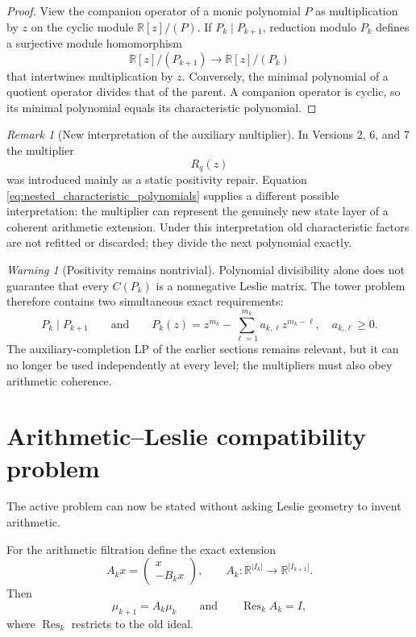 \documentclass[11pt]{amsart}
\numberwithin{equation}{section}
\theoremstyle{plain}
\theoremstyle{definition}
\theoremstyle{remark}
\newtheorem{remark}[theorem]{Remark}
\newtheorem{warning}[theorem]{Warning}
\begin{document}
\begin{proof}
View the companion operator of a monic polynomial $P$ as multiplication by $z$ on the cyclic
module $\mathbb R[z]/(P)$.  If $P_k\mid P_{k+1}$, reduction modulo $P_k$ defines a surjective
module homomorphism
\[
\mathbb R[z]/(P_{k+1})
\longrightarrow
\mathbb R[z]/(P_k)
\]
that intertwines multiplication by $z$.  Conversely, the minimal polynomial of a quotient
operator divides that of the parent.  A companion operator is cyclic, so its minimal polynomial
equals its characteristic polynomial.
\end{proof}

\begin{remark}[New interpretation of the auxiliary multiplier]
\label{rem:auxiliary_as_arithmetic_layer}
In Versions 2, 6, and 7 the multiplier
\[
R_q(z)
\]
was introduced mainly as a static positivity repair.  Equation
\eqref{eq:nested_characteristic_polynomials} supplies a different possible interpretation:
the multiplier can represent the genuinely new state layer of a coherent arithmetic extension.
Under this interpretation old characteristic factors are not refitted or discarded; they divide
the next polynomial exactly.
\end{remark}

\begin{warning}[Positivity remains nontrivial]
\label{warn:tower_positivity}
Polynomial divisibility alone does not guarantee that every $C(P_k)$ is a nonnegative Leslie
matrix.  The tower problem therefore contains two simultaneous exact requirements:
\[
P_k\mid P_{k+1}
\qquad\text{and}\qquad
P_k(z)=z^{m_k}-\sum_{\ell=1}^{m_k}a_{k,\ell}z^{m_k-\ell},
\quad
a_{k,\ell}\ge0.
\]
The auxiliary-completion LP of the earlier sections remains relevant, but it can no longer be
used independently at every level; the multipliers must also obey arithmetic coherence.
\end{warning}


\section{Arithmetic--Leslie compatibility problem}
\label{sec:arithmetic_leslie_compatibility}

The active problem can now be stated without asking Leslie geometry to invent arithmetic.

For the arithmetic filtration define the exact extension
\begin{equation}
A_kx=
\begin{pmatrix}
x\\
-B_kx
\end{pmatrix},
\qquad
A_k:\mathbb R^{|I_k|}\to\mathbb R^{|I_{k+1}|}.
\label{eq:arithmetic_extension_operator}
\end{equation}
Then
\[
\mu_{k+1}=A_k\mu_k
\qquad\text{and}\qquad
\operatorname{Res}_kA_k=I,
\]
where $\operatorname{Res}_k$ restricts to the old ideal.
\end{document}
